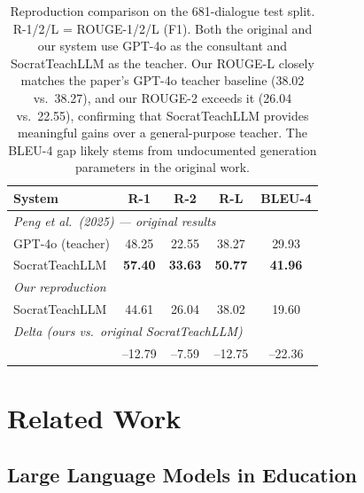 \documentclass[11pt]{article}
\begin{document}
\begin{table}[t]
  \centering
  \small
  \begin{tabular}{lcccc}
    \toprule
    \textbf{System} & \textbf{R-1} & \textbf{R-2} & \textbf{R-L} & \textbf{BLEU-4} \\
    \midrule
    \multicolumn{5}{l}{\emph{Peng et al.\ (2025) --- original results}} \\
    \quad GPT-4o (teacher)        & 48.25 & 22.55 & 38.27 & 29.93 \\
    \quad SocratTeachLLM          & \textbf{57.40} & \textbf{33.63} & \textbf{50.77} & \textbf{41.96} \\
    \midrule
    \multicolumn{5}{l}{\emph{Our reproduction}} \\
    \quad SocratTeachLLM          & 44.61 & 26.04 & 38.02 & 19.60 \\
    \midrule
    \multicolumn{5}{l}{\emph{Delta (ours vs.\ original SocratTeachLLM)}} \\
    \quad                         & --12.79 & --7.59 & --12.75 & --22.36 \\
    \bottomrule
  \end{tabular}
  \caption{Reproduction comparison on the 681-dialogue test split. R-1/2/L = ROUGE-1/2/L (F1). Both the original and our system use GPT-4o as the consultant and SocratTeachLLM as the teacher. Our ROUGE-L closely matches the paper's GPT-4o teacher baseline (38.02 vs.\ 38.27), and our ROUGE-2 exceeds it (26.04 vs.\ 22.55), confirming that SocratTeachLLM provides meaningful gains over a general-purpose teacher. The BLEU-4 gap likely stems from undocumented generation parameters in the original work.}
  \label{tab:reproduction}
\end{table}

\section{Related Work}

\subsection{Large Language Models in Education}
\end{document}
